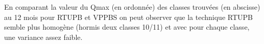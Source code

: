 %
%









%
En comparant la valeur du Qmax (en ordonnée) des classes trouvées (en abscisse)  au 12  mois pour RTUPB et VPPBS  on peut observer que la technique RTUPB semble plus homogène (hormis deux classes 10/11)  et avec pour chaque classe, une variance assez faible. 